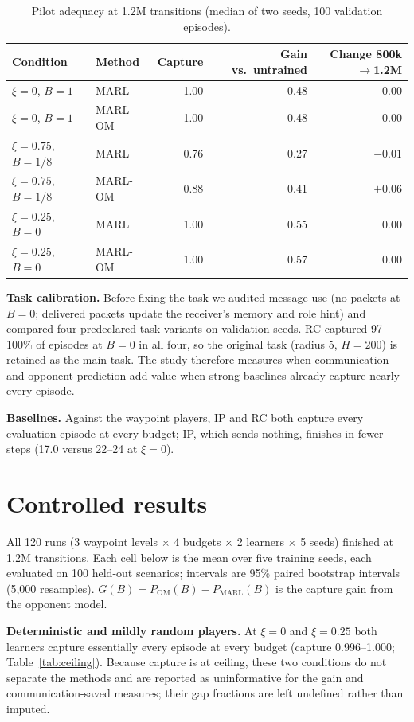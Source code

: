 \documentclass{article}
\begin{document}
\begin{table}[t]
\centering
\caption{Pilot adequacy at 1.2M transitions (median of two seeds, 100 validation episodes).}
\label{tab:adequacy}
\begin{tabular}{llrrr}
\toprule
Condition & Method & Capture & Gain vs.\ untrained & Change 800k$\to$1.2M \\
\midrule
$\xi=0$, $B=1$ & MARL & 1.00 & 0.48 & 0.00 \\
$\xi=0$, $B=1$ & MARL-OM & 1.00 & 0.48 & 0.00 \\
$\xi=0.75$, $B=1/8$ & MARL & 0.76 & 0.27 & $-0.01$ \\
$\xi=0.75$, $B=1/8$ & MARL-OM & 0.88 & 0.41 & $+0.06$ \\
$\xi=0.25$, $B=0$ & MARL & 1.00 & 0.55 & 0.00 \\
$\xi=0.25$, $B=0$ & MARL-OM & 1.00 & 0.57 & 0.00 \\
\bottomrule
\end{tabular}
\end{table}

\textbf{Task calibration.} Before fixing the task we audited message use (no packets at $B=0$; delivered packets update the receiver's memory and role hint) and compared four predeclared task variants on validation seeds. RC captured 97--100\% of episodes at $B=0$ in all four, so the original task (radius 5, $H=200$) is retained as the main task. The study therefore measures when communication and opponent prediction add value when strong baselines already capture nearly every episode.

\textbf{Baselines.} Against the waypoint players, IP and RC both capture every evaluation episode at every budget; IP, which sends nothing, finishes in fewer steps (17.0 versus 22--24 at $\xi=0$).

\section{Controlled results}
All 120 runs (3 waypoint levels $\times$ 4 budgets $\times$ 2 learners $\times$ 5 seeds) finished at 1.2M transitions. Each cell below is the mean over five training seeds, each evaluated on 100 held-out scenarios; intervals are 95\% paired bootstrap intervals (5,000 resamples). $G(B)=P_{\text{OM}}(B)-P_{\text{MARL}}(B)$ is the capture gain from the opponent model.

\textbf{Deterministic and mildly random players.} At $\xi=0$ and $\xi=0.25$ both learners capture essentially every episode at every budget (capture 0.996--1.000; Table~\ref{tab:ceiling}). Because capture is at ceiling, these two conditions do not separate the methods and are reported as uninformative for the gain and communication-saved measures; their gap fractions are left undefined rather than imputed.
\end{document}
